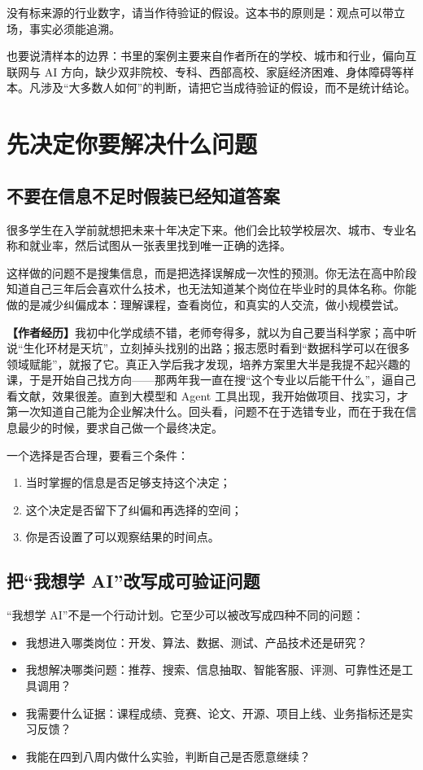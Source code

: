 \documentclass[UTF8,zihao=5,openany]{ctexbook}
\begin{document}
没有标来源的行业数字，请当作待验证的假设。这本书的原则是：观点可以带立场，事实必须能追溯。

也要说清样本的边界：书里的案例主要来自作者所在的学校、城市和行业，偏向互联网与 AI 方向，缺少双非院校、专科、西部高校、家庭经济困难、身体障碍等样本。凡涉及“大多数人如何”的判断，请把它当成待验证的假设，而不是统计结论。

\clearpage
\tableofcontents
\clearpage
\listoffigures
\clearpage
\listoftables
\mainmatter
\clearpage\chapter{先决定你要解决什么问题}
\section{不要在信息不足时假装已经知道答案}
很多学生在入学前就想把未来十年决定下来。他们会比较学校层次、城市、专业名称和就业率，然后试图从一张表里找到唯一正确的选择。

这样做的问题不是搜集信息，而是把选择误解成一次性的预测。你无法在高中阶段知道自己三年后会喜欢什么技术，也无法知道某个岗位在毕业时的具体名称。你能做的是减少纠偏成本：理解课程，查看岗位，和真实的人交流，做小规模尝试。

\begin{casebox}
\textbf{【作者经历】}我初中化学成绩不错，老师夸得多，就以为自己要当科学家；高中听说“生化环材是天坑”，立刻掉头找别的出路；报志愿时看到“数据科学可以在很多领域赋能”，就报了它。真正入学后我才发现，培养方案里大半是我提不起兴趣的课，于是开始自己找方向——那两年我一直在搜“这个专业以后能干什么”，逼自己看文献，效果很差。直到大模型和 Agent 工具出现，我开始做项目、找实习，才第一次知道自己能为企业解决什么。回头看，问题不在于选错专业，而在于我在信息最少的时候，要求自己做一个最终决定。
\end{casebox}

一个选择是否合理，要看三个条件：
\begin{enumerate}
\item 当时掌握的信息是否足够支持这个决定；
\item 这个决定是否留下了纠偏和再选择的空间；
\item 你是否设置了可以观察结果的时间点。
\end{enumerate}

\section{把“我想学 AI”改写成可验证问题}
“我想学 AI”不是一个行动计划。它至少可以被改写成四种不同的问题：
\begin{itemize}
\item 我想进入哪类岗位：开发、算法、数据、测试、产品技术还是研究？
\item 我想解决哪类问题：推荐、搜索、信息抽取、智能客服、评测、可靠性还是工具调用？
\item 我需要什么证据：课程成绩、竞赛、论文、开源、项目上线、业务指标还是实习反馈？
\item 我能在四到八周内做什么实验，判断自己是否愿意继续？
\end{itemize}
\end{document}
